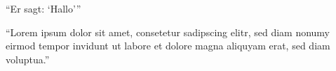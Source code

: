 \enquote{Er sagt: \enquote{Hallo}} \cite[Abs. X]{db_engines}

\textelp{}

\begin{displayquote}
\enquote{Lorem ipsum dolor sit amet, consetetur sadipscing elitr, sed diam nonumy eirmod
tempor invidunt ut labore et dolore magna aliquyam erat, sed diam voluptua.}
\end{displayquote}